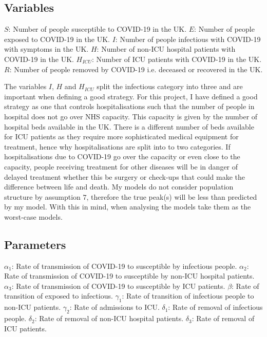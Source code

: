 \documentclass[11pt]{article}
\begin{document}
\subsection{Variables}
$S$: Number of people susceptible to COVID-19 in the UK.
\newline $E$: Number of people exposed to COVID-19 in the UK.
\newline $I$: Number of people infectious with COVID-19 with symptoms in the UK.
\newline $H$: Number of non-ICU hospital patients with COVID-19 in the UK.
\newline $H_{ICU}$: Number of ICU patients with COVID-19 in the UK.
\newline $R$: Number of people removed by COVID-19 i.e. deceased or recovered in the UK.\par
The variables $I$, $H$ and $H_{ICU}$ split the infectious category into three and are important when defining a good strategy. For this project, I have defined a good strategy as one that controls hospitalisations such that the number of people in hospital does not go over NHS capacity. This capacity is given by the number of hospital beds available in the UK\citep{HBEDS}. There is a different number of beds available for ICU patients as they require more sophisticated medical equipment for treatment, hence why hospitalisations are split into to two categories. If hospitalisations due to COVID-19 go over the capacity or even close to the capacity, people receiving treatment for other diseases will be in danger of delayed treatment whether this be surgery or check-ups that could make the difference between life and death. My models do not consider population structure by assumption $7$, therefore the true peak(s) will be less than predicted by my model. With this in mind, when analysing the models take them as the worst-case models.
\subsection{Parameters}
$ \alpha_1$: Rate of transmission of COVID-19 to susceptible by infectious people.
\newline $ \alpha_2$: Rate of transmission of COVID-19 to susceptible by non-ICU hospital patients.
\newline$ \alpha_3$: Rate of transmission of COVID-19 to susceptible by ICU patients.
\newline$ \beta$: Rate of transition of exposed to infectious.
\newline $ \gamma_1 $: Rate of transition of infectious people to non-ICU patients.
\newline $ \gamma_2 $: Rate of admissions to ICU.
\newline $ \delta_1$: Rate of removal of infectious people.
\newline $ \delta_2$: Rate of removal of non-ICU hospital patients.
\newline $ \delta_3$: Rate of removal of ICU patients. \par
\end{document}

